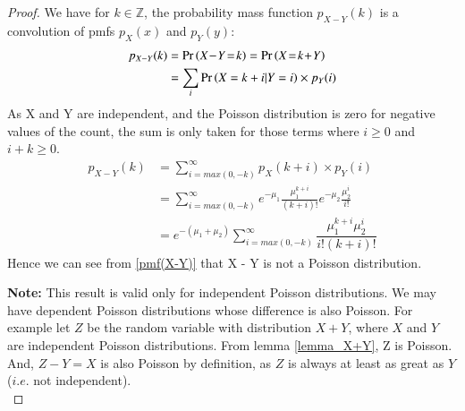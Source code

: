 \documentclass[journal,12pt,twocolumn]{IEEEtran}
\begin{document}
    \begin{proof}
         We have for $k \in \mathbb{Z}$, the probability mass function $p_{X-Y}(k)$ is a convolution of pmfs $p_X(x)$ and $p_Y(y)$: 
    \begin{align}
       p_{X-Y}(k) &= \pr{X\! -\! Y\! =\! k} = \pr{X\! =\! k\! +\! Y}\\
       &= \sum_{i}\pr{X = k + i| Y = i}\times p_Y(i)\label{p_(x-y)}
    \end{align}
    As X and Y are independent, and the Poisson distribution is zero for negative values of the count, the sum is only taken for those terms where $i \geq 0$ and $i+k\geq 0$. 
    \begin{align}
        p_{X-Y}(k) &= \sum_{i=max(0, -k)}^\infty p_X(k+i) \times p_Y(i)\\
        &=\sum_{i=max(0, -k)}^\infty e^{-\mu_1}\frac{\mu_1^{k+i}}{(k+i)!}e^{-\mu_2}\frac{\mu_2^i}{i!}\\
        &= e^{-(\mu_1 + \mu_2)}\sum_{i=max(0, -k)}^\infty \dfrac{\mu _{1}^{k+i}\mu _{2}^{i}}{i!(k+i)!}\label{pmf(X-Y)}
    \end{align}
    Hence we can see from \eqref{pmf(X-Y)} that X - Y is not a Poisson distribution.\\
    
    \par \textbf{Note: } This result is valid only for independent Poisson distributions. We may have dependent Poisson distributions whose difference is also Poisson. For example let $Z$ be the random variable with distribution $X + Y$, where $X$ and $Y$ are independent Poisson distributions. From lemma \eqref{lemma_X+Y}, Z is Poisson. And, $Z - Y = X$ is also Poisson by definition, as $Z$ is always at least as great as $Y$ ($i.e.$ not independent).\\
    \end{proof}
    
\end{document}
